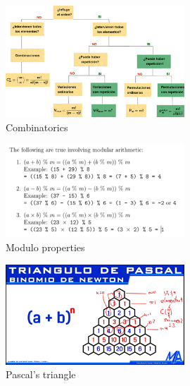 \begin{figure}[H]
    \centering
    \includegraphics[width=0.6\textwidth]{code/pictures/Combinatorics.jpg}
    \caption{Combinatorics}
    \label{Combinatorics}
\end{figure}
\begin{figure}[H]
    \centering
    \includegraphics[width=0.6\textwidth]{code/pictures/Modulo_properties.png}
    \caption{Modulo properties}
    \label{Modulo_properties}
\end{figure}

\begin{figure}[H]
    \centering
    \includegraphics[width=0.6\textwidth]{code/pictures/Pascal_triangle.png}
    \caption{Pascal's triangle}
    \label{Pascal_triangle}
\end{figure}